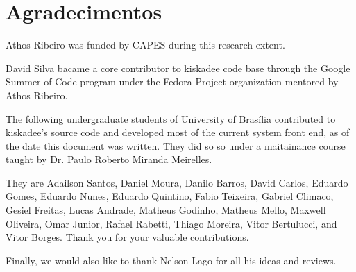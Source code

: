 \chapter*{Agradecimentos}

Athos Ribeiro was funded by CAPES during this research extent.

David Silva bacame a core contributor to kiskadee code base through the Google
Summer of Code program under the Fedora Project organization mentored by Athos
Ribeiro.

The following undergraduate students of University of Brasília contributed to
kiskadee's source code and developed most of the current system front end, as of
the date this document was written. They did so so under a maitainance course
taught by Dr. Paulo Roberto Miranda Meirelles.

They are Adailson Santos,
Daniel Moura,
Danilo Barros,
David Carlos,
Eduardo Gomes,
Eduardo Nunes,
Eduardo Quintino,
Fabio Teixeira,
Gabriel Climaco,
Gesiel Freitas,
Lucas Andrade,
Matheus Godinho,
Matheus Mello,
Maxwell Oliveira,
Omar Junior,
Rafael Rabetti,
Thiago Moreira,
Vitor Bertulucci, and
Vitor Borges.
Thank you for your valuable contributions.

Finally, we would also like to thank Nelson Lago for all his ideas and reviews.

